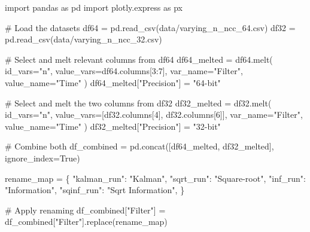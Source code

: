 \documentclass[
]{report}
\newenvironment{Shaded}{\begin{snugshade}}{\end{snugshade}}
\newcommand{\CommentTok}[1]{\textcolor[rgb]{0.37,0.37,0.37}{#1}}
\newcommand{\DecValTok}[1]{\textcolor[rgb]{0.68,0.00,0.00}{#1}}
\newcommand{\ImportTok}[1]{\textcolor[rgb]{0.00,0.46,0.62}{#1}}
\newcommand{\NormalTok}[1]{\textcolor[rgb]{0.00,0.23,0.31}{#1}}
\newcommand{\OperatorTok}[1]{\textcolor[rgb]{0.37,0.37,0.37}{#1}}
\newcommand{\StringTok}[1]{\textcolor[rgb]{0.13,0.47,0.30}{#1}}
\newcommand{\VariableTok}[1]{\textcolor[rgb]{0.07,0.07,0.07}{#1}}
\begin{document}
\begin{Shaded}
\begin{Highlighting}[]
\ImportTok{import}\NormalTok{ pandas }\ImportTok{as}\NormalTok{ pd}
\ImportTok{import}\NormalTok{ plotly.express }\ImportTok{as}\NormalTok{ px}

\CommentTok{\# Load the datasets}
\NormalTok{df64 }\OperatorTok{=}\NormalTok{ pd.read\_csv(}\StringTok{\textquotesingle{}data/varying\_n\_ncc\_64.csv\textquotesingle{}}\NormalTok{)}
\NormalTok{df32 }\OperatorTok{=}\NormalTok{ pd.read\_csv(}\StringTok{\textquotesingle{}data/varying\_n\_ncc\_32.csv\textquotesingle{}}\NormalTok{)}

\CommentTok{\# Select and melt relevant columns from df64}
\NormalTok{df64\_melted }\OperatorTok{=}\NormalTok{ df64.melt(}
\NormalTok{    id\_vars}\OperatorTok{=}\StringTok{"n"}\NormalTok{,}
\NormalTok{    value\_vars}\OperatorTok{=}\NormalTok{df64.columns[}\DecValTok{3}\NormalTok{:}\DecValTok{7}\NormalTok{],}
\NormalTok{    var\_name}\OperatorTok{=}\StringTok{"Filter"}\NormalTok{,}
\NormalTok{    value\_name}\OperatorTok{=}\StringTok{"Time"}
\NormalTok{)}
\NormalTok{df64\_melted[}\StringTok{"Precision"}\NormalTok{] }\OperatorTok{=} \StringTok{"64{-}bit"}

\CommentTok{\# Select and melt the two columns from df32}
\NormalTok{df32\_melted }\OperatorTok{=}\NormalTok{ df32.melt(}
\NormalTok{    id\_vars}\OperatorTok{=}\StringTok{"n"}\NormalTok{,}
\NormalTok{    value\_vars}\OperatorTok{=}\NormalTok{[df32.columns[}\DecValTok{4}\NormalTok{], df32.columns[}\DecValTok{6}\NormalTok{]],}
\NormalTok{    var\_name}\OperatorTok{=}\StringTok{"Filter"}\NormalTok{,}
\NormalTok{    value\_name}\OperatorTok{=}\StringTok{"Time"}
\NormalTok{)}
\NormalTok{df32\_melted[}\StringTok{"Precision"}\NormalTok{] }\OperatorTok{=} \StringTok{"32{-}bit"}

\CommentTok{\# Combine both}
\NormalTok{df\_combined }\OperatorTok{=}\NormalTok{ pd.concat([df64\_melted, df32\_melted], ignore\_index}\OperatorTok{=}\VariableTok{True}\NormalTok{)}

\NormalTok{rename\_map }\OperatorTok{=}\NormalTok{ \{}
    \StringTok{"kalman\_run"}\NormalTok{: }\StringTok{"Kalman"}\NormalTok{,}
    \StringTok{"sqrt\_run"}\NormalTok{: }\StringTok{"Square{-}root"}\NormalTok{,}
    \StringTok{"inf\_run"}\NormalTok{: }\StringTok{"Information"}\NormalTok{,}
    \StringTok{"sqinf\_run"}\NormalTok{: }\StringTok{"Sqrt Information"}\NormalTok{,}
\NormalTok{\}}

\CommentTok{\# Apply renaming}
\NormalTok{df\_combined[}\StringTok{"Filter"}\NormalTok{] }\OperatorTok{=}\NormalTok{ df\_combined[}\StringTok{"Filter"}\NormalTok{].replace(rename\_map)}



\end{Highlighting}
\end{Shaded}
\end{document}
